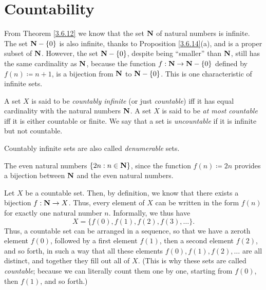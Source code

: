 \section{Countability}\label{sec 8.1}

\begin{note}
    From Theorem \ref{3.6.12} we know that the set \(\mathbf{N}\) of natural numbers is infinite.
    The set \(\mathbf{N} - \{0\}\) is also infinite, thanks to Proposition \ref{3.6.14}(a), and is a proper subset of \(\mathbf{N}\).
    However, the set \(\mathbf{N} - \{0\}\), despite being ``smaller'' than \(\mathbf{N}\), still has the same cardinality as \(\mathbf{N}\), because the function \(f : \mathbf{N} \to \mathbf{N} - \{0\}\) defined by \(f(n) \coloneqq n + 1\), is a bijection from \(\mathbf{N}\) to \(\mathbf{N} - \{0\}\).
    This is one characteristic of infinite sets.
\end{note}

\begin{definition}\label{8.1.1}
    A set \(X\) is said to be \emph{countably infinite} (or just \emph{countable}) iff it has equal cardinality with the natural numbers \(\mathbf{N}\).
    A set \(X\) is said to be \emph{at most countable} iff it is either countable or finite.
    We say that a set is \emph{uncountable} if it is infinite but not countable.
\end{definition}

\begin{remark}\label{8.1.2}
    Countably infinite sets are also called \emph{denumerable} sets.
\end{remark}

\begin{example}\label{8.1.3}
    The even natural numbers \(\{2n : n \in \mathbf{N}\}\), since the function \(f(n) \coloneqq 2n\) provides a bijection between \(\mathbf{N}\) and the even natural numbers.
\end{example}

\begin{note}
    Let \(X\) be a countable set.
    Then, by definition, we know that there exists a bijection \(f : \mathbf{N} \to X\).
    Thus, every element of \(X\) can be written in the form \(f(n)\) for exactly one natural number \(n\).
    Informally, we thus have
    \[
        X = \{f(0), f(1), f(2), f(3), \dots\}.
    \]
    Thus, a countable set can be arranged in a sequence, so that we have a zeroth element \(f(0)\), followed by a first element \(f(1)\), then a second element \(f(2)\), and so forth, in such a way that all these elements \(f(0), f(1), f(2), \dots\) are all distinct, and together they fill out all of \(X\).
    (This is why these sets are called \emph{countable};
    because we can literally count them one by one, starting from \(f(0)\), then \(f(1)\), and so forth.)
\end{note}

